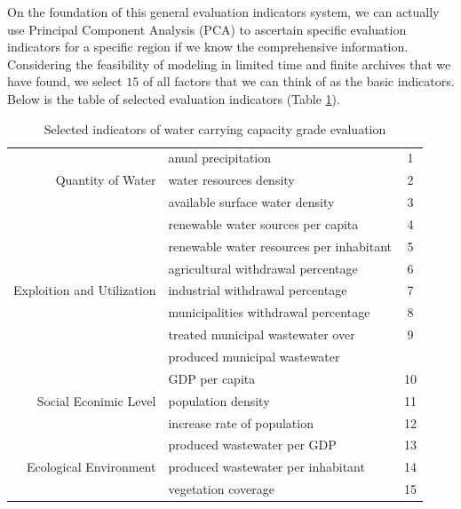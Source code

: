 On the foundation of this general evaluation indicators system, we can actually use Principal Component Analysis (PCA) to ascertain specific evaluation indicators for a specific region if we know the comprehensive information. Considering the feasibility of modeling in limited time and finite archives that we have found, we select $15$ of all factors that we can think of as the basic indicators. Below is the table of selected evaluation indicators (Table \ref{selected}).
\begin{table} [!htbp]
\centering\caption{Selected indicators of water carrying capacity grade evaluation}
\begin{tabular}{r|l|c}
  \hline
   & anual precipitation & 1 \\
  Quantity of Water & water resources density & 2 \\
   & available surface water density & 3 \\
   & renewable water sources per capita & 4 \\
   \hline
   & renewable water resources per inhabitant & 5 \\
   & agricultural withdrawal percentage&6 \\
  Exploition and Utilization & industrial withdrawal percentage&7 \\
   & municipalities withdrawal percentage &8 \\
   & treated municipal wastewater over  &9 \\
   & produced municipal wastewater & \\
   \hline
   & GDP per capita &10 \\
  Social Econimic Level & population density &11 \\
   & increase rate of population &12 \\
    \hline
   & produced wastewater per GDP &13 \\
  Ecological Environment & produced wastewater per inhabitant &14 \\
   & vegetation coverage &15 \\
  \hline
\end{tabular}\label{selected}
\end{table}

